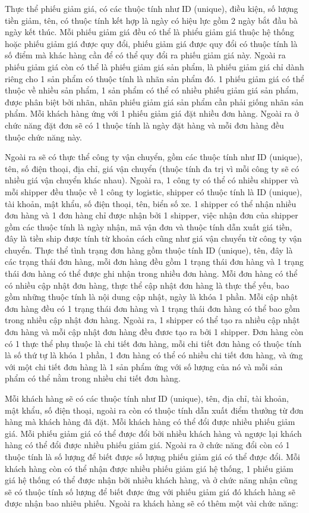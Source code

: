 Thực thể phiếu giảm giá, có các thuộc tính như ID (unique), điều kiện, số lượng tiền giảm, tên, có thuộc tính kết hợp là ngày có hiệu lực gồm 2 ngày bắt đầu bà ngày kết thúc. Mỗi phiếu giảm giá đều có thể là phiểu giảm giá thuộc hệ thống hoặc phiếu giảm giá được quy đổi, phiếu giảm giá được quy đổi có thuộc tính là số điểm mà khác hàng cần để có thể quy đổi ra phiếu giảm giá này. Ngoài ra phiếu giảm giá còn có thể là phiếu giảm giá sản phẩm, là phiếu giảm giá chỉ dành riêng cho 1 sản phẩm có thuộc tính là nhãn sản phẩm đó. 1 phiếu giảm giá có thể thuộc về nhiều sản phẩm, 1 sản phẩm có thể có nhiều phiếu giảm giá sản phẩm, được phân biệt bởi nhãn, nhãn phiếu giảm giá sản phẩm cần phải giống nhãn sản phẩm. Mỗi khách hàng ứng với 1 phiếu giảm giá đặt nhiều đơn hàng. Ngoài ra ở chức năng đặt đơn sẽ có 1 thuộc tính là ngày đặt hàng và mỗi đơn hàng đều thuộc chức năng này. 

Ngoài ra sẽ có thực thể công ty vận chuyển, gồm các thuộc tính như ID (unique), tên, số điện thoại, địa chỉ, giá vận chuyển (thuộc tính đa trị vì mỗi công ty sẽ có nhiều giá vận chuyển khác nhau). Ngoài ra, 1 công ty có thể có nhiều shipper và mỗi shipper đều thuộc về 1 công ty logistic, shipper có thuộc tính là ID (unique), tài khoản, mật khẩu, số điện thoại, tên, biển số xe. 1 shipper có thể nhận nhiều đơn hàng và 1 đơn hàng chỉ được nhận bởi 1 shipper, việc nhận đơn của shipper gồm các thuộc tính là ngày nhận, mã vận đơn và thuộc tính dẫn xuất giá tiền, đây là tiền ship được tính từ khoản cách cũng như giá vận chuyển từ công ty vận chuyển. Thực thể tình trạng đơn hàng gồm thuộc tính ID (unique), tên, đây là các trạng thái đơn hàng, mỗi đơn hàng đều gồm 1 trạng thái đơn hàng và 1 trạng thái đơn hàng có thể được ghi nhận trong nhiều đơn hàng. Mỗi đơn hàng có thể có nhiều cập nhật đơn hàng, thực thể cập nhật đơn hàng là thực thể yếu, bao gồm những thuộc tính là nội dung cập nhật, ngày là khóa 1  phần. Mỗi cập nhật đơn hàng đều có 1  trạng thái đơn hàng và 1 trạng thái đơn hàng có thể bao gồm trong nhiều cập nhật đơn hàng. Ngoài ra, 1 shipper có thể tạo ra nhiều cập nhật đơn hàng và mỗi cập nhật đơn hàng đều đươc tạo ra bởi 1 shipper. Đơn hàng còn có 1  thực thể phụ thuộc là chi tiết đơn hàng, mỗi chi tiết đơn hàng có thuộc tính là số thứ tự là khóa 1  phần, 1  đơn hàng có thể có nhiều chi tiết đơn hàng, và ứng với một chi tiết đơn hàng là 1 sản phẩm ứng với số lượng của nó và mỗi sản phẩm có thể nằm trong nhiều chi tiết đơn hàng.

Mỗi khách hàng sẽ có các thuộc tính như ID (unique), tên, địa chỉ, tài khoản, mật khẩu, số điện thoại, ngoài ra còn có thuộc tính dẫn xuất điểm thưởng từ đơn hàng mà khách hàng đã đặt. Mỗi khách hàng có thể đổi được nhiều phiếu giảm giá. Mỗi phiếu giảm giá có thể được đổi bởi nhiều khách hàng và ngược lại khách hàng có thể đổi được nhiều phiếu giảm giá. Ngoài ra ở chức năng đổi còn có 1  thuộc tính là số lượng để biết được số lượng phiếu giảm giá có thể được đổi. Mỗi khách hàng còn có thể nhận được nhiều phiếu giảm giá hệ thống, 1  phiếu giảm giá hệ thống có thể được nhận bởi nhiều khách hàng, và ở chức năng nhận cũng sẽ có thuộc tính số lượng để biết được ứng với phiếu giảm giá đó khách hàng sẽ được nhận bao nhiêu phiếu. Ngoài ra khách hàng sẽ có thêm một vài chức năng:

